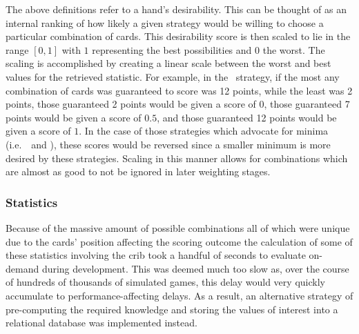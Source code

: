 %
The above definitions refer to a hand's desirability.
%
This can be thought of as an internal ranking of how likely a given strategy
would be willing to choose a particular combination of cards.
%
This desirability score is then scaled to lie in the range $[0, 1]$ with
$1$ representing the best possibilities and $0$ the worst.
%
The scaling is accomplished by creating a linear scale
between the worst and best values
for the retrieved statistic.
%
For example,
in the \handmaxmin\ strategy,
if the most any combination of cards was guaranteed to score was 12 points,
while the least was 2 points,
those guaranteed 2 points would be given a score of $0$,
those guaranteed 7 points would be given a score of $0.5$,
and those guaranteed 12 points would be given a score of $1$.
%
In the case of those strategies which advocate for minima
(i.e.\ \peggingminavggiven\ and \cribminavg),
these scores would be reversed
since a smaller minimum is more desired by these strategies.
%
Scaling in this manner
allows for combinations which are almost as good to not be
ignored in later weighting stages.


\subsubsection*{Statistics}

Because of the massive amount of possible combinations%
\textemdash all of which were unique due to the cards' position affecting the
scoring outcome\textemdash%
the calculation of some of these statistics involving the crib
took a handful of seconds to evaluate on-demand during development.
%
This was deemed much too slow as,
over the course of hundreds of thousands of simulated games,
this delay would very quickly accumulate to performance-affecting delays.
%
As a result, an alternative strategy of pre-computing the required knowledge and
storing the values of interest into a relational database was implemented instead.

